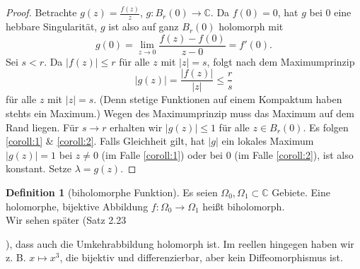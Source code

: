 \documentclass[11pt,titlepage]{article}
\theoremstyle{definition}
\newtheorem{definition}[theorem]{Definition}
\theoremstyle{remark}
\begin{document}
	\begin{proof}
		Betrachte $g(z)=\frac{f(z)}{z}$, $g:B_r(0)\to\mathbb{C}$. Da $f(0)=0$, hat $g$ bei $0$ 
		eine hebbare Singularität, $g$ ist also auf ganz $B_r(0)$ holomorph mit 
		\[ g(0)=\lim_{z\to 0}\frac{f(z)-f(0)}{z-0}=f'(0). \]
		Sei $s<r$. Da $|f(z)|\leq r$ für alle $z$ mit $|z|=s$, folgt nach dem Maximumprinzip
		\[ |g(z)| =\frac{|f(z)|}{|z|}\leq \frac{r}{s} \]
		für alle $z$ mit $|z|=s$. (Denn stetige Funktionen auf einem Kompaktum haben stehts ein 
		Maximum.) Wegen des Maximumprinzip muss das Maximum auf dem Rand liegen. 
		Für $s\to r$ erhalten wir $|g(z)|\leq 1$ für alle $ z\in B_r(0)$. Es folgen \ref{coroll:1} \& 
		\ref{coroll:2}. Falls Gleichheit gilt, hat $|g|$ ein lokales Maximum $|g(z)|=1$ bei $z\neq 0$ 
		(im Falle \ref{coroll:1}) oder bei $0$ (im Falle \ref{coroll:2}), ist also konstant. Setze 
		$\lambda=g(z)$.
	\end{proof}
	
	\begin{definition}[biholomorphe Funktion]
		Es seien $\Omega_0 ,\Omega_1\subset\mathbb{C}$ Gebiete. Eine holomorphe, bijektive 
		Abbildung $f:\Omega_0\to\Omega_1$ heißt biholomorph. \\
		Wir sehen später (Satz 2.23
		
		
		), dass auch die Umkehrabbildung holomorph ist. Im reellen hingegen haben wir z. B. 
		$x\mapsto x^3$, die bijektiv und differenzierbar, aber kein Diffeomorphismus ist.
	\end{definition}
	
\end{document}
